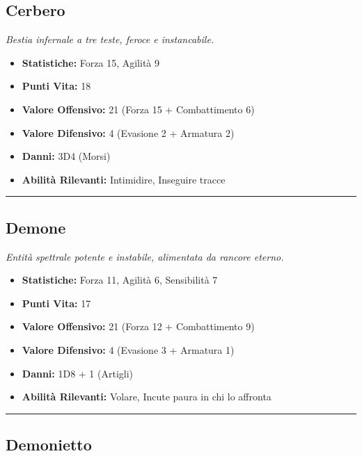 \documentclass[../manuale_main.tex]{subfiles}
\begin{document}
\subsection*{Cerbero}

\textit{Bestia infernale a tre teste, feroce e instancabile.}
\begin{itemize}
\item \textbf{Statistiche:} Forza 15, Agilità 9
\item \textbf{Punti Vita:} 18
\item \textbf{Valore Offensivo:} 21 (Forza 15 + Combattimento 6)
\item \textbf{Valore Difensivo:} 4 (Evasione 2 + Armatura 2)
\item \textbf{Danni:} 3D4 (Morsi)
\item \textbf{Abilità Rilevanti:} Intimidire, Inseguire tracce
\end{itemize}

\vspace{0.2cm}
\noindent
\begin{center}
\rule{\textwidth}{0.4pt} 
\end{center}

\clearpage
\subsection*{Demone}
\textit{Entità spettrale potente e instabile, alimentata da rancore eterno.}
\begin{itemize}
\item \textbf{Statistiche:} Forza 11, Agilità 6, Sensibilità 7
\item \textbf{Punti Vita:} 17
\item \textbf{Valore Offensivo:} 21 (Forza 12 + Combattimento 9)
\item \textbf{Valore Difensivo:} 4 (Evasione 3 + Armatura 1)
\item \textbf{Danni:} 1D8 + 1 (Artigli)
\item \textbf{Abilità Rilevanti:} Volare, Incute paura in chi lo affronta
\end{itemize}
\vspace{0.2cm}
\noindent
\begin{center}
\rule{\textwidth}{0.4pt} 
\end{center}
\vspace{0.2cm}


\subsection*{Demonietto}
\end{document}
